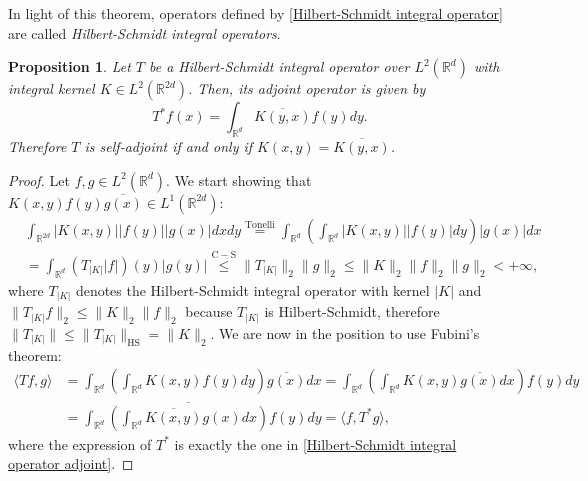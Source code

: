 \documentclass[corpo=11pt, stile=classica, tipotesi=custom,
greek, evenboxes, english]{toptesi}
\numberwithin{equation}{chapter}
\newtheorem{prop}[teo]{Proposition}
\theoremstyle{definition}
\theoremstyle{remark}
\newcommand{\R}{\mathbb{R}} %
\begin{document}
In light of this theorem, operators defined by \eqref{Hilbert-Schmidt integral operator} are called \emph{Hilbert-Schmidt integral operators}.

\begin{prop}\label{condition integral operator self-adjoint}
	Let $T$ be a Hilbert-Schmidt integral operator over $L^2(\R^d)$ with integral kernel $K \in L^2(\R^{2d})$. Then, its adjoint operator is given by
	\begin{equation}\label{Hilbert-Schmidt integral operator adjoint}
		T^*f(x) = \int_{\R^d} \overline{K(y,x)} f(y)dy.
	\end{equation}
	Therefore $T$ is self-adjoint if and only if $K(x,y) = \overline{K(y,x)}$.
\end{prop}
\begin{proof}
	Let $f,g \in L^2(\R^d)$. We start showing that $K(x,y)f(y)\overline{g(x)} \in L^1(\R^{2d})$:
	\begin{align*}
		&\int_{\R^{2d}} |K(x,y)| |f(y)| |g(x)| dxdy \overset{\mathrm{Tonelli}}{=} \int_{\R^d} \left(\int_{\R^d} |K(x,y)||f(y)| dy\right) |g(x)| dx \\
		&= \int_{\R^d} (T_{|K|} |f|)(y) |g(y)| \overset{\mathrm{C-S}}{\leq} \|T_{|K|}\|_2 \|g\|_2 \leq \|K\|_2 \| f \|_2 \|g\|_2 < +\infty,
	\end{align*}
	where $T_{|K|}$ denotes the Hilbert-Schmidt integral operator with kernel $|K|$ and $\|T_{|K|} f\|_2 \leq \|K\|_2 \| f \|_2$ because $T_{|K|}$ is Hilbert-Schmidt, therefore $\|T_{|K|}\| \leq \|T_{|K|}\|_{\mathrm{HS}} = \| K \|_2$. We are now in the position to use Fubini's theorem:
	\begin{align*}
		\langle Tf,g \rangle &= \int_{\R^d} \left(\int_{\R^d} K(x,y)f(y)dy\right)\overline{g(x)}dx = \int_{\R^d} \left(\int_{\R^d} K(x,y)\overline{g(x)}dx\right) f(y)dy \\
							 &= \int_{\R^d} \overline{\left(\int_{\R^d} \overline{K(x,y)} g(x)dx\right)} f(y)dy = \langle f,T^*g \rangle,
	\end{align*}
	where the expression of $T^*$ is exactly the one in \eqref{Hilbert-Schmidt integral operator adjoint}.
\end{proof}
\end{document}
